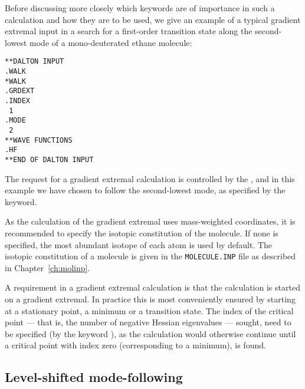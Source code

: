Before discussing more closely which keywords are of importance in
such a calculation and how they are to be used, we give an example of
a typical gradient extremal input in a search for a first-order
transition state along the second-lowest mode of a mono-deuterated
ethane molecule:

\begin{verbatim}
**DALTON INPUT
.WALK
*WALK
.GRDEXT
.INDEX
 1
.MODE
 2
**WAVE FUNCTIONS
.HF
**END OF DALTON INPUT
\end{verbatim}


The request for a gradient extremal
calculation is controlled by the {}, and in this example
we have chosen to follow the second-lowest mode, as specified by the
 keyword.

As the calculation of the gradient extremal uses mass-weighted
coordinates, it is recommended to
specify the isotopic constitution of
the molecule. If none is specified, the most abundant
isotope of each atom is used by default. The isotopic constitution of
a molecule is given in the \verb|MOLECULE.INP| file as described in Chapter~\ref{ch:molinp}.

A requirement in a gradient extremal calculation is that the
calculation is started on a gradient extremal. In practice this is
most conveniently ensured by starting at a stationary point, a minimum
or a transition state. The index of the critical point
--- that is,
the number of negative Hessian eigenvalues
--- sought, need to
be specified (by the keyword ), as the calculation would
otherwise continue until a critical point with index zero
(corresponding to a minimum), is found.

\subsection{Level-shifted mode-following}\label{sec:modfol}

\begin{center}
\end{center}

